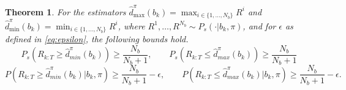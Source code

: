 \documentclass[acmlarge, manuscript, screen, review, natbib=false, oneside]{acmart}
\newtheorem{theorem}{Theorem}[section]
\begin{document}
\begin{theorem}\label{prf:d_guarantees}
	For the estimators $\hat{d}_{\max}^\pi(b_k) = \max_{i \in \{1,\dots,N_b\}} R^i$ and $\hat{d}_{\min}^\pi(b_k) = \min_{i \in \{1,\dots,N_b\}} R^i$, where $R^1,\dots,R^{N_b} \sim P_s(\cdot | b_k, \pi)$, and for $\epsilon$ as defined in \eqref{eq:epsilon}, the following bounds hold. 
	\begin{equation}
		P_s(R_{k:T} \geq \hat{d}_{min}^\pi(b_k))\geq\frac{N_b}{N_b+1}, \qquad P_s(R_{k:T} \leq \hat{d}_{max}^\pi(b_k))\geq\frac{N_b}{N_b+1}
	\end{equation}
	\begin{equation}
		P\!\left(R_{k:T} \geq \hat{d}_{min}^\pi(b_k) \Big| b_k ,\pi \right)
		\geq \frac{N_b}{N_b+1} - \epsilon, \qquad
		P\!\left(R_{k:T} \leq \hat{d}_{max}^\pi(b_k) \Big| b_k ,\pi \right)
		\geq \frac{N_b}{N_b+1} - \epsilon.
	\end{equation}
\end{theorem}
\end{document}
